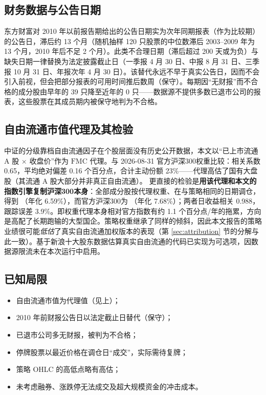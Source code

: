 \documentclass[11pt,a4paper]{article}
\newcommand{\FMC}{\mathrm{FMC}}
\begin{document}
\subsection{财务数据与公告日期}\label{sec:fin}
东方财富对 2010 年以前报告期给出的公告日期实为次年同期报表（作为比较期）的公告日，滞后约 13 个月（随机抽样 120 只股票的中位数滞后 2003--2009 年为 13 个月，2010 年后不足 2 个月）。此类不合理日期（滞后超过 200 天或为负）与缺失日期一律替换为法定披露截止日（一季报 4 月 30 日、中报 8 月 31 日、三季报 10 月 31 日、年报次年 4 月 30 日）。该替代永远不早于真实公告日，因而不会引入前视，但会把部分报表的可用时间推后数周（保守）。每期因“无财报”而不合格的成分股由早年的 39 只降至近年的 0 只——数据源不提供多数已退市公司的报表，这些股票在其成员期内被保守地判为不合格。
\FloatBarrier
\subsection{自由流通市值代理及其检验}\label{sec:fmc}
中证的分级靠档自由流通因子在个股层面没有历史公开数据，本文以“已上市流通 A 股 × 收盘价”作为 $\FMC$ 代理。与 2026-08-31 官方沪深300权重比较：相关系数 0.65，平均绝对偏差 0.16 个百分点，合计主动份额 23\%——代理高估了国有大盘股（其流通 A 股大部分并非真正自由流通）。
更直接的检验是\textbf{用该代理和本文的指数引擎复制沪深300本身}：全部成分股按代理权重、在与策略相同的日期调仓，得到 （年化 6.59\%），而官方沪深300为 （年化 7.68\%）；两者日收益相关 0.988，跟踪误差 3.9\%。即权重代理本身相对官方指数有约 1.1 个百分点/年的拖累，方向是高配了长期跑输的大型国企。策略权重继承了同样的倾斜，因此本文报告的策略业绩很可能\emph{低估}了真实自由流通加权版本的表现（第 \ref{sec:attribution} 节的分解与此一致）。基于新浪十大股东数据估算真实自由流通的代码已实现为可选项，因数据源限流未在本次运行中启用。
\FloatBarrier
\subsection{已知局限}
\begin{itemize}\item 自由流通市值为代理值（见上）；\item 2010 年前财报公告日以法定截止日替代（保守）；\item 已退市公司多无财报，被判为不合格；\item 停牌股票以最近价格在调仓日“成交”，实际需待复牌；\item 策略 OHLC 的高低点略有高估；\item 未考虑融券、涨跌停无法成交及超大规模资金的冲击成本。\end{itemize}
\end{document}
